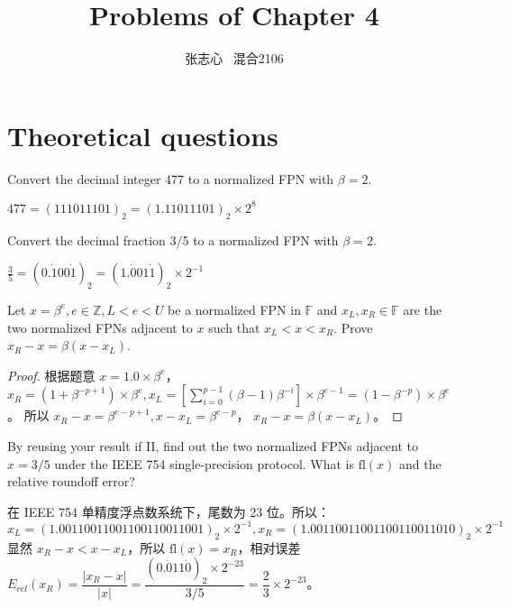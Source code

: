 \documentclass[lang=cn,a4paper,newtx,bibend=bibtex]{elegantpaper}
\title{Problems of Chapter 4}
\author{张志心 \ 混合2106}
\date{\zhdate{2023/12/3}}
\begin{document}
\maketitle

\section{Theoretical questions}

\begin{prob}[4.4.1-\textrm{I}.]
  Convert the decimal integer 477 to a normalized FPN with $\beta = 2$.
\end{prob}

\begin{solution}
  $477 = (111011101)_2 = (1.11011101)_2\times 2^8$
\end{solution}



\begin{prob}[4.4.1-\textrm{II}.]
  Convert the decimal fraction 3/5 to a normalized FPN with $\beta = 2$.
\end{prob}

\begin{solution} 
 $\frac35 = (0.\dot{1}00\dot{1})_2 = (1.\dot{0}01\dot{1})_2 \times 2^{-1}$
\end{solution}

\begin{prob}
  Let $x = \beta^e, e\in \mathbb{Z}, L < e < U$ be a normalized FPN in $\mathbb{F}$
  and $x_L, x_R\in \mathbb{F}$ are the two normalized FPNs adjacent to $x$ such that
  $x_L < x < x_R$. Prove $x_R - x = \beta(x - x_L)$.
\end{prob}

\begin{proof}
  根据题意 $x = 1.0 \times \beta^e$，
  $x_R = (1 + \beta^{-p + 1})\times \beta^e, x_L = \left[\sum_{i = 0}^{p-1} (\beta - 1)\beta^{-i}\right]\times\beta^{e- 1} = (1- \beta^{-p})\times \beta^e$。
  所以 $x_R - x = \beta^{e-p+1}, x-x_L = \beta^{e-p}$， $x_R - x = \beta(x - x_L)$。
\end{proof}

\begin{prob}[4.4.1-\textrm{IV}.]
  By reusing your result if \textrm{II}, find out the two normalized FPNs adjacent
  to $x = 3/5$ under the IEEE 754 single-precision protocol. What is $\text{fl}(x)$ and 
  the relative roundoff error?
\end{prob}

\begin{solution}
  在 IEEE 754 单精度浮点数系统下，尾数为 23 位。所以：
  \[x_L = (1.00110011001100110011001)_2 \times 2^{-1}, x_R = (1.00110011001100110011010)_2\times 2^{-1}\]
  显然 $x_R - x < x - x_L$，所以 $\text{fl}(x) = x_R$，相对误差 $E_{rel}(x_R) = \dfrac{|x_R - x|}{|x|} = \dfrac{(0.\dot{0}11\dot{0})_2\times 2^{-23}}{3/5} = \dfrac{2}{3}\times 2^{-23}$。
\end{solution}
\end{document}
